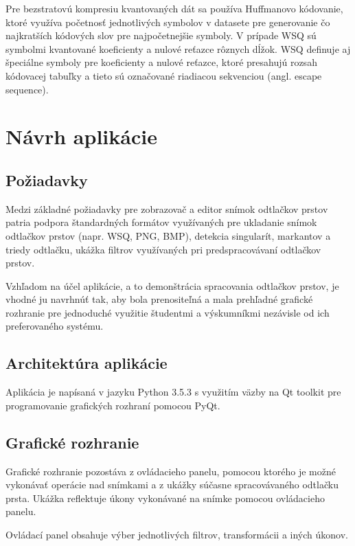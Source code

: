   Pre bezstratovú kompresiu kvantovaných dát sa používa Huffmanovo kódovanie, ktoré využíva početnosť jednotlivých symbolov v datasete pre 
  generovanie čo najkratších kódových slov pre najpočetnejšie symboly. V prípade WSQ sú symbolmi kvantované koeficienty a nulové reťazce
  rôznych dĺžok. WSQ definuje aj špeciálne symboly pre koeficienty a nulové reťazce, ktoré presahujú rozsah kódovacej tabuľky a tieto sú označované
  riadiacou sekvenciou (angl. escape sequence).

\chapter{Návrh aplikácie} \label{kap:navrh_appky}
  \section{Požiadavky}
  Medzi základné požiadavky pre zobrazovač a editor snímok odtlačkov prstov patria podpora štandardných formátov využívaných
  pre ukladanie snímok odtlačkov prstov (napr. WSQ, PNG, BMP),
  detekcia singularít, markantov a triedy odtlačku, ukážka filtrov využívaných pri predspracovávaní odtlačkov prstov.

  Vzhľadom na účel aplikácie, a to demonštrácia spracovania odtlačkov prstov, je vhodné ju navrhnúť tak, aby bola prenositeľná a mala prehľadné 
  grafické rozhranie pre jednoduché využitie študentmi a výskumníkmi nezávisle od ich preferovaného systému.

  \section{Architektúra aplikácie}
  Aplikácia je napísaná v jazyku Python 3.5.3 s využitím väzby na Qt toolkit pre programovanie grafických rozhraní pomocou PyQt.
  

  \section{Grafické rozhranie}
  Grafické rozhranie pozostáva z ovládacieho panelu, pomocou ktorého je možné vykonávať operácie nad snímkami a z ukážky súčasne
  spracovávaného odtlačku prsta. Ukážka reflektuje úkony vykonávané na snímke pomocou ovládacieho panelu.

  Ovládací panel obsahuje výber jednotlivých filtrov, transformácii a iných úkonov. %

